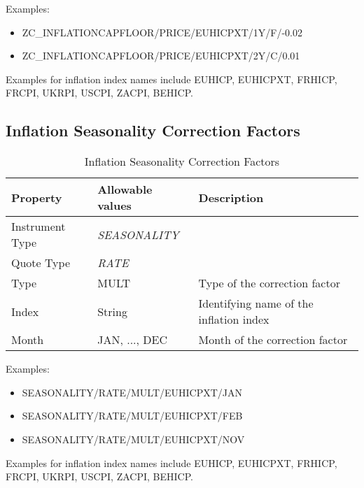 \medskip
Examples:
\begin{itemize}
\item {ZC\_INFLATIONCAPFLOOR/PRICE/EUHICPXT/1Y/F/-0.02}
\item {ZC\_INFLATIONCAPFLOOR/PRICE/EUHICPXT/2Y/C/0.01}
\end{itemize}

Examples for inflation index names include EUHICP, EUHICPXT, FRHICP, FRCPI, UKRPI, USCPI, ZACPI, BEHICP.

\subsection{Inflation Seasonality Correction Factors}

\begin{table}[H]
    \centering
    \begin{tabular}{|p{3cm}|p{3.5cm}|p{7cm}|}
      \hline
      {\bf Property} & {\bf Allowable values} & {\bf Description} \\ \hline
      Instrument Type & \emph{SEASONALITY} & \\ \hline
      Quote Type & \emph{RATE} & \\ \hline
      Type & MULT & Type of the correction factor \\ \hline
      Index & String & Identifying name of the inflation index \\ \hline
      Month & JAN, ..., DEC & Month of the correction factor \\ \hline
    \end{tabular}
    \caption{Inflation Seasonality Correction Factors}
    \label{tab:inflationseasonality_quote}
\end{table}

\medskip
Examples:
\begin{itemize}
\item SEASONALITY/RATE/MULT/EUHICPXT/JAN
\item SEASONALITY/RATE/MULT/EUHICPXT/FEB
\item SEASONALITY/RATE/MULT/EUHICPXT/NOV
\end{itemize}

Examples for inflation index names include EUHICP, EUHICPXT, FRHICP, FRCPI, UKRPI, USCPI, ZACPI, BEHICP.

